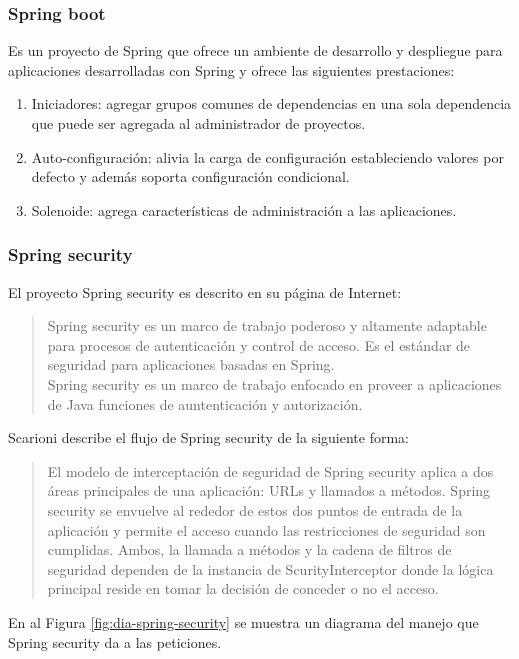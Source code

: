 \subsubsection{Spring boot}\label{sec:spring-boot}
Es un proyecto de Spring que ofrece un ambiente de desarrollo y despliegue para aplicaciones desarrolladas con Spring y ofrece las siguientes prestaciones\cite{SpringBootInAction}:
\begin{enumerate}
	\item Iniciadores: agregar grupos comunes de dependencias en una sola dependencia que puede ser agregada al administrador de proyectos.
	\item Auto-configuración: alivia la carga de configuración estableciendo valores por defecto y además soporta configuración condicional.
	\item Solenoide: agrega características de administración a las aplicaciones.
\end{enumerate}

\subsubsection{Spring security}\label{sec:spring-security}
El proyecto Spring security es descrito en su página de Internet\cite{SpringSecurity}:
\begin{quote}
	Spring security es un marco de trabajo poderoso y altamente adaptable para procesos de autenticación y control de acceso. Es el estándar de seguridad para aplicaciones basadas en Spring.\\
	Spring security es un marco de trabajo enfocado en proveer a aplicaciones de Java funciones de auntenticación y autorización.
\end{quote}

Scarioni\cite{ProSpringSecurity} describe el flujo de Spring security de la siguiente forma:
\begin{quote}
	El modelo de interceptación de seguridad de Spring security aplica a dos áreas principales de una aplicación: URLs y llamados a métodos. Spring security se envuelve al rededor de estos dos puntos de entrada de la aplicación y permite el acceso cuando las restricciones de seguridad son cumplidas. Ambos, la llamada a métodos y la cadena de filtros de seguridad dependen de la instancia de ScurityInterceptor donde la lógica principal reside en tomar la decisión de conceder o no el acceso.
\end{quote}
En al Figura \ref{fig:dia-spring-security} se muestra un diagrama del manejo que Spring security da a las peticiones.

